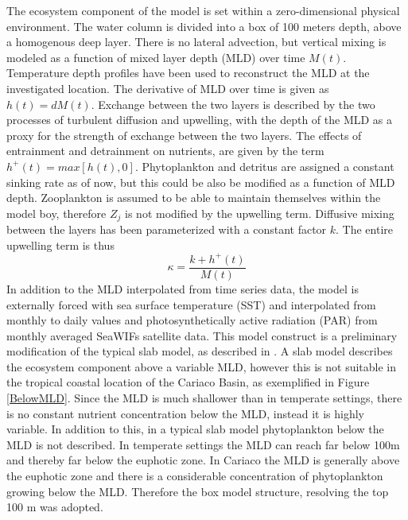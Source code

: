 The ecosystem component of the model is set within a zero-dimensional physical environment. The water column is divided into a box of 100 meters depth, above a homogenous deep layer. 
There is no lateral advection, but vertical mixing is modeled as a function of mixed layer depth (MLD) over time $M(t)$. Temperature depth profiles have been used to reconstruct the MLD at the investigated location. 
The derivative of MLD over time is given as $h(t) = dM(t)$. 
Exchange between the two layers is described by the two processes of turbulent diffusion and upwelling, 
with the depth of the MLD as a proxy for the strength of exchange between the two layers. The effects of entrainment and detrainment on nutrients, are given by the term $h^{+}(t)= max[h(t),0]$. 
Phytoplankton and detritus are assigned a constant sinking rate as of now, but this could be also be modified as a function of MLD depth. Zooplankton is assumed to be able to maintain themselves within the model boy,
therefore $Z_j$ is not modified by the upwelling term. Diffusive mixing between the layers has been parameterized with a constant factor $k$. The entire upwelling term is thus
\begin{equation}
\kappa = \frac{k + h^{+}(t)}{M(t)}
\end{equation}
In addition to the MLD interpolated from time series data, the model is externally forced with sea surface temperature (SST) and interpolated from monthly to daily values and photosynthetically active radiation (PAR) from monthly averaged SeaWIFs satellite data.
This model construct is a preliminary modification of the typical slab model, as described in \citet{Anderson2015}. A slab model describes the ecosystem component above a variable MLD, however this is not suitable in the tropical coastal location of the Cariaco Basin, as exemplified in Figure \ref{BelowMLD}. Since the MLD is much shallower than in temperate settings, there is no constant nutrient concentration below the MLD, instead it is highly variable. In addition to this, in a typical slab model phytoplankton below the MLD is not described. In temperate settings the MLD can reach far below 100m and thereby far below the euphotic zone. In Cariaco the MLD is generally above the euphotic zone and there is a considerable concentration of phytoplankton growing below the MLD. Therefore the box model structure, resolving the top 100 m was adopted.


